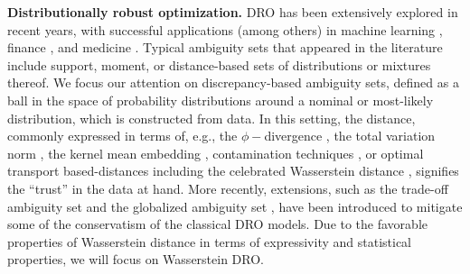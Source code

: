 \documentclass[12pt]{article}
\renewcommand{\paragraph}[1]{\textbf{#1.}\;}
\begin{document}
\paragraph{Distributionally robust optimization}
\Gls{DRO} has been extensively explored in recent years, with successful applications (among others) in machine learning \cite{shafieezadeh2015distributionally}, finance \cite{blanchet2022distributionally}, and medicine \cite{tsang2024stochastic}.  Typical ambiguity sets that appeared in the literature include support, moment, or distance-based sets of distributions or mixtures thereof. 
We focus our attention on discrepancy-based ambiguity sets, defined as a ball in the space of probability distributions around a nominal or most-likely distribution, which is constructed from data. In this setting, the distance, commonly expressed in terms of, e.g., the $\phi-$divergence \cite{bayraksan2015data}, the total variation norm \cite{tzortzis2015dynamic}, the kernel mean embedding \cite{hannah2010nonparametric}, contamination techniques \cite{kopa2023robustness},  or optimal transport based-distances including
the celebrated Wasserstein distance \cite{mohajerin2018data,kannan2024residuals}, signifies the “trust” in the data at hand. More recently, extensions, such as the trade-off ambiguity set \cite{tsang2024trade} and the globalized ambiguity set \cite{li2024globalized}, have been introduced to mitigate some of the conservatism of the classical DRO models. Due to the favorable properties
of Wasserstein distance in terms of expressivity and statistical properties, we will focus on Wasserstein DRO. 
\end{document}
